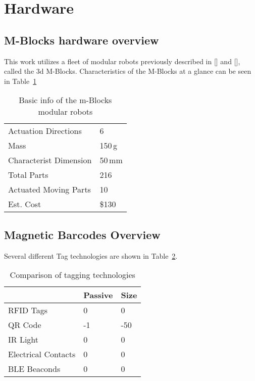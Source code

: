 \section{Hardware}
\label{sec:Hardware}


\subsection{M-Blocks hardware overview}
\label{sec:3dmblocksOverview}

This work utilizes a fleet of modular robots previously described in []  and [], called the 3d M-Blocks. Characteristics of the M-Blocks at a glance can be seen in Table~\ref{tab:hardwareOverview}

\begin{table}[h]
  \caption{Basic info of the m-Blocks modular robots}

  \begin{tabular}{ p{3.4cm}  p{1.9cm} }
    \hline
    Actuation Directions & 6 \\
    Mass  & 150\,g \\
    Characterist Dimension & 50\,mm \\
    Total Parts  & 216 \\
    Actuated Moving Parts  & 10 \\
    Est. Cost & \$130 \\

  \end{tabular}

    \label{tab:hardwareOverview}
\end{table}


\subsection{Magnetic Barcodes Overview}
\label{sec:FlywheelAndBraking}

Several different Tag technologies are shown in Table~\ref{tab:info}.

\begin{table}[h]
  \caption{Comparison of tagging technologies}

  \begin{tabular}{ p{3.4cm}  p{1.9cm}  p{1.9cm} }
    \hline
    & Passive & Size \\
    \hline
    RFID Tags & 0 & 0  \\
    QR Code &  -1 & -50 \\
    IR Light & 0 & 0 \\
    Electrical Contacts & 0 & 0 \\
    BLE Beaconds & 0 & 0 \\

    \end{tabular}

  \label{tab:info}
\end{table}


